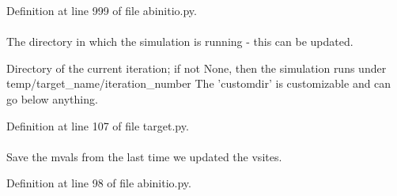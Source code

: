 \-Definition at line 999 of file abinitio.\-py.

\hypertarget{classforcebalance_1_1target_1_1Target_a1da470037ef61c22dc44beb85cfa01a9}{
\paragraph[{rundir}]{}}\label{classforcebalance_1_1target_1_1Target_a1da470037ef61c22dc44beb85cfa01a9}


\-The directory in which the simulation is running -\/ this can be updated. 

\-Directory of the current iteration; if not \-None, then the simulation runs under temp/target\-\_\-name/iteration\-\_\-number \-The 'customdir' is customizable and can go below anything.

\-Definition at line 107 of file target.\-py.

\hypertarget{classforcebalance_1_1abinitio_1_1AbInitio_a430661954fff8c1979eb9ac28523bb5e}{
\paragraph[{save\-\_\-vmvals}]{}}\label{classforcebalance_1_1abinitio_1_1AbInitio_a430661954fff8c1979eb9ac28523bb5e}


\-Save the mvals from the last time we updated the vsites. 



\-Definition at line 98 of file abinitio.\-py.

\hypertarget{classforcebalance_1_1target_1_1Target_aede2856573b890cd47054ad36937d6f6}{
\paragraph[{tempdir}]{}}\label{classforcebalance_1_1target_1_1Target_aede2856573b890cd47054ad36937d6f6}


